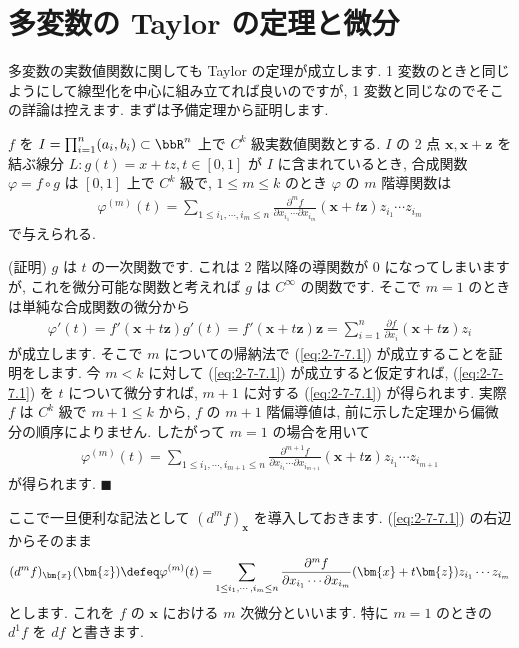 \documentclass[openany, a4paper, oneside]{jsbook}
\begin{document}
\section{多変数の Taylor の定理と微分}

多変数の実数値関数に関しても Taylor の定理が成立します.
1 変数のときと同じようにして線型化を中心に組み立てれば良いのですが,
1 変数と同じなのでそこの詳論は控えます.
まずは予備定理から証明します.

\begin{thm}\label{thm:2-7-7.1}
 $f$ を $I=\prod_{i=1}^{n} (a_i,b_i)\subset\bbR^n$ 上で $C^k$ 級実数値関数とする.
 $I$ の 2 点 $\bm{x},\bm{x}+\bm{z}$ を結ぶ線分 $L:g (t)=x+tz,t\in[0,1]$ が $I$ に含まれているとき,
 合成関数 $\varphi=f\circ g$ は $[0,1]$ 上で $C^k$ 級で,  $1\leq m \leq k$ のとき $\varphi$ の $m$ 階導関数は
\begin{align}
 \varphi^{(m)}(t)
 =
 \sum_{1\leq i_1,\dotsb ,i_m \leq n} \frac{\partial ^m f}{\partial x_{i_1} \dotsb \partial x_{i_m}} (\bm{x}+t\bm{z})
 z_{i_1}\dotsb z_{i_m} \label{eq:2-7-7.1}
\end{align}
で与えられる.
\end{thm}
(証明)
$g$ は $t$ の一次関数です. これは 2 階以降の導関数が $0$ になってしまいますが, これを微分可能な関数と考えれば
$g$ は $C^{\infty}$ の関数です. そこで $m=1$ のときは単純な合成関数の微分から
\begin{align}
\varphi '(t)
=
f'(\bm{x}+t\bm{z}) g'(t)
=
f'(\bm{x}+t\bm{z})\bm{z}
=
\sum_{i=1}^n \frac{ \partial f } {\partial x_i} ( \bm{x}+t\bm{z} ) z_i
\end{align}
が成立します. そこで $m$ についての帰納法で (\ref{eq:2-7-7.1}) が成立することを証明をします.
今 $m<k$ に対して (\ref{eq:2-7-7.1}) が成立すると仮定すれば,
(\ref{eq:2-7-7.1}) を $t$ について微分すれば,  $m+1$ に対する (\ref{eq:2-7-7.1}) が得られます.
実際 $f$ は $C^k$ 級で $m+1\leq k$ から,  $f$ の $m+1$ 階偏導値は, 前に示した定理から偏微分の順序によりません.
したがって $m=1$ の場合を用いて
\begin{align}
\varphi^{(m)}(t)
=
\sum_{1\leq i_1,\dotsb ,i_{m+1} \leq n}\frac{\partial ^{m+1} f} {\partial x_{i_1} \dotsb \partial x_{i_{m+1}}}
(\bm{x}+t\bm{z}) z_{i_1}\dotsb z_{i_{m+1}}
\end{align}
が得られます.  $\blacksquare$

ここで一旦便利な記法として $(d^mf)_{\bm{x}}$ を導入しておきます.
(\ref{eq:2-7-7.1}) の右辺からそのまま
\begin{align}
    (d^mf)_{\bm{x}} (\bm{z})
    \defeq
    \varphi^{(m)}(t)
    =
    \sum_{1\leq i_1,\dotsb ,i_m \leq n}\frac{\partial ^m f} {\partial x_{i_1} \dotsb \partial x_{i_m}}(\bm{x}+t\bm{z})
            z_{i_1}\dotsb z_{i_m}
\end{align}
とします. これを $f$ の $\bm{x}$ における $m$ 次微分といいます.
特に $m=1$ のときの $d^1f$ を $df$ と書きます.
\end{document}
